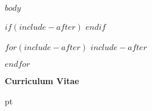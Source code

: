 \documentclass[11 pt]{report}
\begin{document}

\startofchapters

$body$

%

\pagebreak
$if(include-after)$
\appendix
\renewcommand{\theequation}{\thechapter.\arabic{equation}}
$endif$

$for(include-after)$
$include-after$

$endfor$


%


%
\pagebreak
\vspace*{.26 in}
\begin{center}
    {\Large \bf Curriculum Vitae}
\end{center}
 pt
\noindent

\noindent
\end{document}
